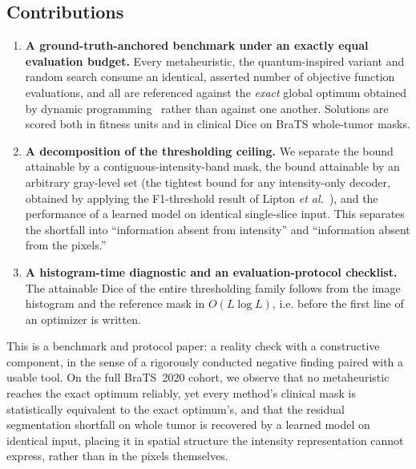 \subsection{Contributions}
\begin{enumerate}
  \item \textbf{A ground-truth-anchored benchmark under an exactly equal
  evaluation budget.} Every metaheuristic, the quantum-inspired variant and
  random search consume an identical, asserted number of objective function
  evaluations, and all are referenced against the \emph{exact} global optimum
  obtained by dynamic programming~\cite{menotti_ciarp} rather than against one
  another. Solutions are scored both in fitness units and in clinical Dice on
  BraTS whole-tumor masks.

  \item \textbf{A decomposition of the thresholding ceiling.} We separate the
  bound attainable by a contiguous-intensity-band mask, the bound attainable by
  an arbitrary gray-level set (the tightest bound for any intensity-only
  decoder, obtained by applying the F1-threshold result of Lipton \emph{et
  al.}~\cite{lipton_f1}), and the performance of a learned model on identical
  single-slice input. This separates the shortfall into ``information absent
  from intensity'' and ``information absent from the pixels.''

  \item \textbf{A histogram-time diagnostic and an evaluation-protocol
  checklist.} The attainable Dice of the entire thresholding family follows from
  the image histogram and the reference mask in $O(L \log L)$, i.e. before the
  first line of an optimizer is written.
\end{enumerate}

This is a benchmark and protocol paper: a reality check with a constructive
component, in the sense of a rigorously conducted negative finding paired with a
usable tool. On the full BraTS~2020 cohort, we observe that no metaheuristic
reaches the exact optimum reliably, yet every method's clinical mask is
statistically equivalent to the exact optimum's, and that the residual
segmentation shortfall on whole tumor is recovered by a learned model on
identical input, placing it in spatial structure the intensity representation
cannot express, rather than in the pixels themselves.

